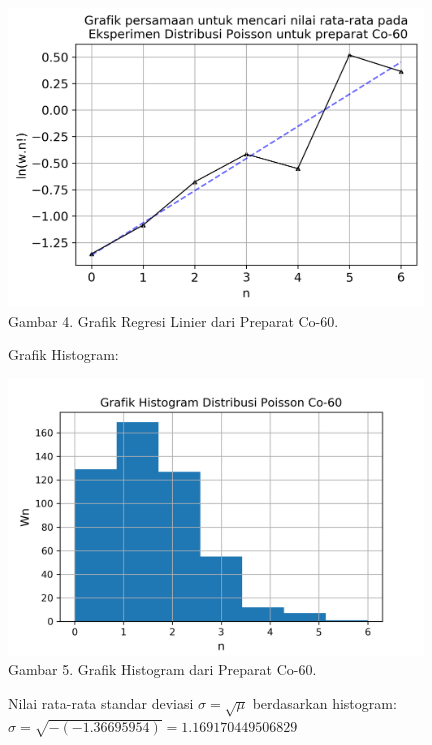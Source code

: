 \documentclass{article}
\begin{document}
			\begin{center}
				\includegraphics[width=110mm]{Data/Co-60-Graph.png}\\
				Gambar 4. Grafik Regresi Linier dari Preparat Co-60.
			\end{center}\newpage
			Grafik Histogram:
			\begin{center}
				\includegraphics[width=110mm]{Data/Co-60.png}\\
				Gambar 5. Grafik Histogram dari Preparat Co-60.
			\end{center} 
			Nilai rata-rata standar deviasi $\sigma = \sqrt{\mu}$ berdasarkan histogram:\\
			$\sigma = \sqrt{-(-1.36695954)} = 1.169170449506829$ 		
			
\end{document}
